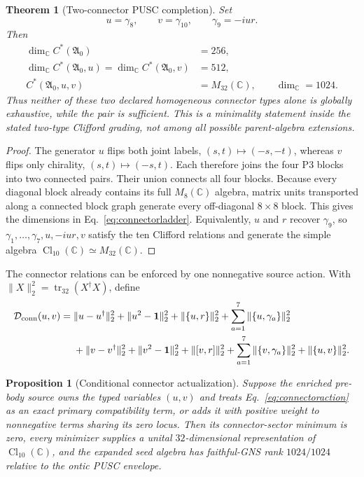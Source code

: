 \documentclass[11pt,a4paper]{article}
\newtheorem{theorem}[definition]{Theorem}
\newtheorem{proposition}[definition]{Proposition}
\theoremstyle{remark}
\newcommand{\id}{\mathbf 1}
\begin{document}
\begin{theorem}[Two-connector PUSC completion]
Set
\begin{equation}
 u=\gamma_8,
 \qquad v=\gamma_{10},
 \qquad \gamma_9=-iur.
 \label{eq:uvconnectors}
\end{equation}
Then
\begin{align}
 \dim_{\mathbb C}C^*(\mathfrak A_0)&=256,\nonumber\\
 \dim_{\mathbb C}C^*(\mathfrak A_0,u)
 =\dim_{\mathbb C}C^*(\mathfrak A_0,v)&=512,\nonumber\\
 C^*(\mathfrak A_0,u,v)&=M_{32}(\mathbb C),
 \qquad \dim_{\mathbb C}=1024.
 \label{eq:connectorladder}
\end{align}
Thus neither of these two declared homogeneous connector types alone is
globally exhaustive, while the pair is sufficient.  This is a minimality
statement inside the stated two-type Clifford grading, not among all possible
parent-algebra extensions.
\end{theorem}

\begin{proof}
The generator $u$ flips both joint labels,
$(s,t)\mapsto(-s,-t)$, whereas $v$ flips only chirality,
$(s,t)\mapsto(-s,t)$.  Each therefore joins the four P3 blocks into two
connected pairs.  Their union connects all four blocks.  Because every
diagonal block already contains its full $M_8(\mathbb C)$ algebra, matrix
units transported along a connected block graph generate every off-diagonal
$8\times8$ block.  This gives the dimensions in
Eq.~\eqref{eq:connectorladder}.  Equivalently, $u$ and $r$ recover
$\gamma_9$, so $\gamma_1,\ldots,\gamma_7,u,-iur,v$ satisfy the ten Clifford
relations and generate the simple algebra
$\operatorname{Cl}_{10}(\mathbb C)\simeq M_{32}(\mathbb C)$.
\end{proof}

The connector relations can be enforced by one nonnegative source action.
With $\|X\|_2^2=\operatorname{tr}_{32}(X^\dagger X)$, define
\begin{align}
 \mathcal D_{\rm conn}(u,v)
 ={}&\|u-u^\dagger\|_2^2+\|u^2-\id\|_2^2
     +\|\{u,r\}\|_2^2
     +\sum_{a=1}^7\|\{u,\gamma_a\}\|_2^2\nonumber\\
 &+\|v-v^\dagger\|_2^2+\|v^2-\id\|_2^2
     +\|[v,r]\|_2^2
     +\sum_{a=1}^7\|\{v,\gamma_a\}\|_2^2
     +\|\{u,v\}\|_2^2.
 \label{eq:connectoraction}
\end{align}

\begin{proposition}[Conditional connector actualization]
Suppose the enriched pre-body source owns the typed variables $(u,v)$ and
treats Eq.~\eqref{eq:connectoraction} as an exact primary compatibility term,
or adds it with positive weight to nonnegative terms sharing its zero locus.
Then its connector-sector minimum is zero, every minimizer supplies a unital
$32$-dimensional representation of $\operatorname{Cl}_{10}(\mathbb C)$, and
the expanded seed algebra has faithful-GNS rank $1024/1024$ relative to the
ontic PUSC envelope.
\end{proposition}
\end{document}
